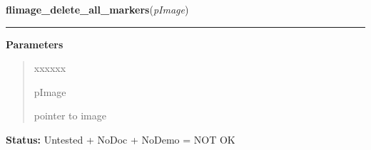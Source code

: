     \label{xformslib:library:flimage_delete_all_markers}

    \vspace{0.5ex}

\hspace{.8\funcindent}\begin{boxedminipage}{\funcwidth}

    \raggedright \textbf{flimage\_delete\_all\_markers}(\textit{pImage})

    \vspace{-1.5ex}

    \rule{\textwidth}{0.5\fboxrule}
\setlength{\parskip}{2ex}
\setlength{\parskip}{1ex}
      \textbf{Parameters}
      \vspace{-1ex}

      \begin{quote}
        \begin{Ventry}{xxxxxx}

          \item[pImage]

          pointer to image

        \end{Ventry}

      \end{quote}

\textbf{Status:} Untested + NoDoc + NoDemo = NOT OK



    \end{boxedminipage}

    \label{xformslib:library:flimage_render_annotation}

    \vspace{0.5ex}

